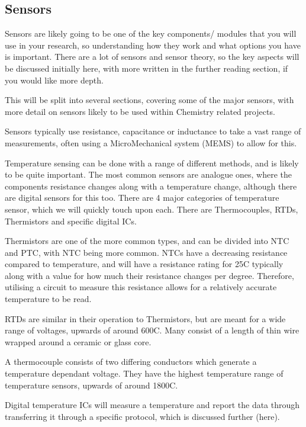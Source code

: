 \documentclass[a4paper,11pt]{report}
\newcommand{\Theory}[1] %
{
\phantomsection %
\todo[inline, color=green!30]{\textbf{#1}} %
\vspace{1em} %
}
\begin{document}
\subsection{Sensors}

\Theory{What are Sensors?}

Sensors are likely going to be one of the key components/ modules that you will use in your research, so understanding how they work and what options you have is important. There are a lot of sensors and sensor theory, so the key aspects will be discussed initially here, with more written in the further reading section, if you would like more depth.

This will be split into several sections, covering some of the major sensors, with more detail on sensors likely to be used within Chemistry related projects.

Sensors typically use resistance, capacitance or inductance to take a vast range of measurements, often using a MicroMechanical system (MEMS) to allow for this.

Temperature sensing can be done with a range of different methods, and is likely to be quite important. The most common sensors are analogue ones, where the components resistance changes along with a temperature change, although there are digital sensors for this too. There are 4 major categories of temperature sensor, which we will quickly touch upon each. There are Thermocouples, RTDs, Thermistors and specific digital ICs.

Thermistors are one of the more common types, and can be divided into NTC and PTC, with NTC being more common. NTCs have a decreasing resistance compared to temperature, and will have a resistance rating for 25C typically along with a value for how much their resistance changes per degree. Therefore, utilising a circuit to measure this resistance allows for a relatively accurate temperature to be read.

RTDs are similar in their operation to Thermistors, but are meant for a wide range of voltages, upwards of around 600C. Many consist of a length of thin wire wrapped around a ceramic or glass core.

A thermocouple consists of two differing conductors which generate a temperature dependant voltage. They have the highest temperature range of temperature sensors, upwards of around 1800C.

Digital temperature ICs will measure a temperature and report the data through transferring it through a specific protocol, which is discussed further (here).
\end{document}

